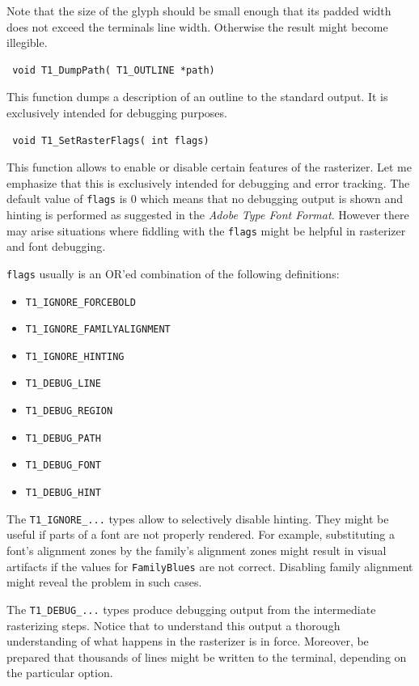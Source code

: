 Note that the size of the glyph should be small enough that its padded width
does not exceed the terminals line width. Otherwise the result might become
illegible. 

\precorr
\begin{verbatim}
 void T1_DumpPath( T1_OUTLINE *path)
\end{verbatim}\postcorr
This function dumps a description of an outline to the standard output. It is
exclusively intended for debugging purposes.


\precorr
\begin{verbatim}
 void T1_SetRasterFlags( int flags)
\end{verbatim}\postcorr
This function allows to enable or disable certain features of the
rasterizer. Let me emphasize that this is exclusively intended for debugging
and error tracking. The default value of \verb+flags+ is 0 which means that no
debugging output is shown and hinting is performed as suggested in the {\em Adobe
Type Font Format}. However there may arise situations where fiddling with the
\verb+flags+ might be helpful in rasterizer and font debugging. 

\verb+flags+ usually is an OR'ed combination of the following definitions:
\begin{itemize}
\item \verb+T1_IGNORE_FORCEBOLD+
\item \verb+T1_IGNORE_FAMILYALIGNMENT+
\item \verb+T1_IGNORE_HINTING+
\item \verb+T1_DEBUG_LINE+
\item \verb+T1_DEBUG_REGION+
\item \verb+T1_DEBUG_PATH+
\item \verb+T1_DEBUG_FONT+
\item \verb+T1_DEBUG_HINT+
\end{itemize}
The \verb+T1_IGNORE_...+ types allow to selectively disable hinting. They
might be useful if parts of a font are not properly rendered. For example,
substituting a font's alignment zones by the family's alignment zones might
result in visual artifacts if the values for \verb+FamilyBlues+ are not
correct. Disabling family alignment might reveal the problem in such cases.

The \verb+T1_DEBUG_...+ types produce debugging output from the intermediate
rasterizing steps. Notice that to understand this output a thorough
understanding of what happens in the rasterizer is in force. Moreover, be
prepared that thousands of lines might be written to the terminal, depending
on the particular option.

